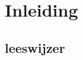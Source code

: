 \chapter*{Inleiding} \label{ch:inleiding} %
\lipsum[01]

\section{leeswijzer} \label{sec:leeswijzer}

